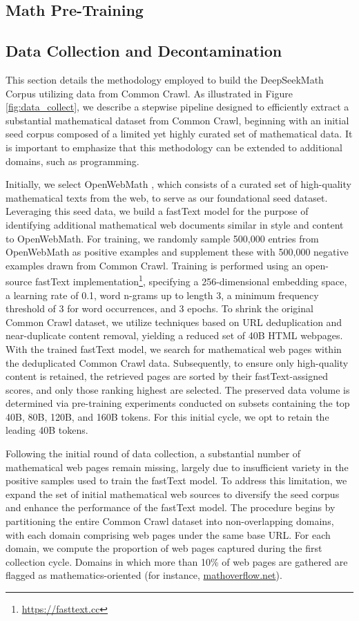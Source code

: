 \begin{itemize}[topsep=0pt]
\section{Math Pre-Training}

\subsection{Data Collection and Decontamination} This section details the methodology employed to build the DeepSeekMath Corpus utilizing data from Common Crawl. As illustrated in Figure \ref{fig:data_collect}, we describe a stepwise pipeline designed to efficiently extract a substantial mathematical dataset from Common Crawl, beginning with an initial seed corpus composed of a limited yet highly curated set of mathematical data. It is important to emphasize that this methodology can be extended to additional domains, such as programming.

Initially, we select OpenWebMath \citep{openwebmath}, which consists of a curated set of high-quality mathematical texts from the web, to serve as our foundational seed dataset. Leveraging this seed data, we build a fastText model \citep{joulin2016fasttext} for the purpose of identifying additional mathematical web documents similar in style and content to OpenWebMath. For training, we randomly sample 500,000 entries from OpenWebMath as positive examples and supplement these with 500,000 negative examples drawn from Common Crawl. Training is performed using an open-source fastText implementation\footnote{\url{https://fasttext.cc}}, specifying a 256-dimensional embedding space, a learning rate of 0.1, word n-grams up to length 3, a minimum frequency threshold of 3 for word occurrences, and 3 epochs. To shrink the original Common Crawl dataset, we utilize techniques based on URL deduplication and near-duplicate content removal, yielding a reduced set of 40B HTML webpages. With the trained fastText model, we search for mathematical web pages within the deduplicated Common Crawl data. Subsequently, to ensure only high-quality content is retained, the retrieved pages are sorted by their fastText-assigned scores, and only those ranking highest are selected. The preserved data volume is determined via pre-training experiments conducted on subsets containing the top 40B, 80B, 120B, and 160B tokens. For this initial cycle, we opt to retain the leading 40B tokens.

Following the initial round of data collection, a substantial number of mathematical web pages remain missing, largely due to insufficient variety in the positive samples used to train the fastText model. To address this limitation, we expand the set of initial mathematical web sources to diversify the seed corpus and enhance the performance of the fastText model. The procedure begins by partitioning the entire Common Crawl dataset into non-overlapping domains, with each domain comprising web pages under the same base URL. For each domain, we compute the proportion of web pages captured during the first collection cycle. Domains in which more than 10\% of web pages are gathered are flagged as mathematics-oriented (for instance, \url{mathoverflow.net}).


\end{itemize}
